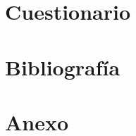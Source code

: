 \documentclass[12pt,a4paper]{article}
\begin{document}
\section{Cuestionario} %

\section{Bibliografía} %
\renewcommand{\bibsection}{}
%

\newpage
\listoffigures
\listoftables
\newpage
\section{Anexo}
\end{document}
